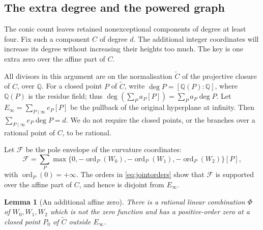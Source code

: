 \documentclass[11pt]{article}
\newtheorem{lemma}[theorem]{Lemma}
\theoremstyle{definition}
\theoremstyle{remark}
\begin{document}
\subsection{The extra degree and the powered graph}\label{sec:jointgraph}

The conic count leaves retained nonexceptional components of degree at
least four. Fix such a component $C$ of degree $d$. The additional
integer coordinates will increase its degree without increasing their
heights too much. The key is one extra zero over the affine part of $C$.

All divisors in this argument are on the normalisation $\widetilde C$
of the projective closure of $C$, over $\mathbb Q$.
For a closed point $P$ of $\widetilde C$, write
$\deg P=[\mathbb Q(P):\mathbb Q]$, where $\mathbb Q(P)$ is the residue field; thus
$\deg(\sum_P a_P[P])=\sum_P a_P\deg P$.
Let $E_\infty=\sum_{P\mid\infty}e_P[P]$ be the pullback of the original
hyperplane at infinity. Then
$\sum_{P\mid\infty}e_P\deg P=d$.  We do not require the closed points, or the
branches over a rational point of $C$, to be rational.

Let $\mathcal F$ be the pole envelope of the curvature coordinates:
\[
 \mathcal F=\sum_P \max\{0,-\operatorname{ord}_P(W_0),
                   -\operatorname{ord}_P(W_1),
                   -\operatorname{ord}_P(W_2)\}[P],
\]
with $\operatorname{ord}_P(0)=+\infty$.
The orders in \eqref{eq:jointorders} show that $\mathcal F$ is supported over the
affine part of $C$, and hence is disjoint from $E_\infty$.

\begin{lemma}[An additional affine zero]\label{lem:jointaffinezero}
There is a rational linear combination $\Phi$ of $W_0,W_1,W_2$ which is
not the zero function and has a positive-order zero at a closed point
$P_0$ of $\widetilde C$ outside $E_\infty$.
\end{lemma}
\end{document}
